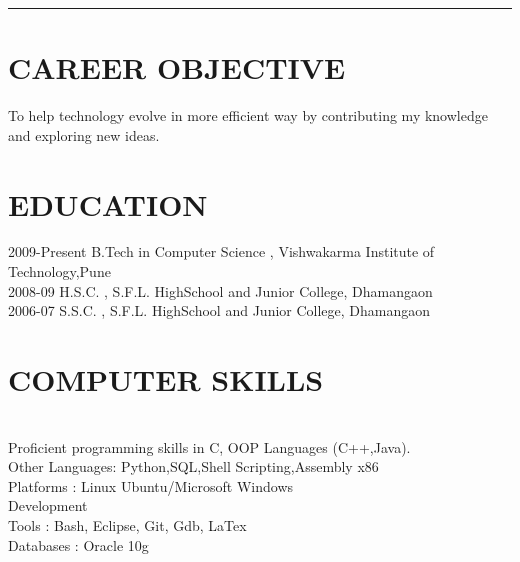 \documentclass{res}
\begin{document}
 


\address{\bf  CONTACT DETAILS\\ \\ Email : aakash.agrawal17@gmail.com\\Ph : +91-9503832567 }
\address{\bf POSTAL ADDRESS \\ Shivaji Nagar, \\ Dhamangaon(Rly) 444709 \\  (07222) 237209}

\begin{resume}
\rule{5.2in}{1pt}
\section{CAREER OBJECTIVE}          
    To help technology evolve in more efficient way by contributing my knowledge and exploring new ideas.           
 
\section{EDUCATION}          
    2009-Present \hspace{2mm} B.Tech in Computer Science , Vishwakarma Institute of Technology,Pune\hspace{2mm}{\bf CPI-9.35}\\        
    2008-09 \hspace{11mm}H.S.C. , S.F.L. HighSchool and Junior College, Dhamangaon\hspace{20mm}{\bf 94.00 \% }\\
    2006-07 \hspace{11mm}S.S.C. , S.F.L. HighSchool and Junior College, Dhamangaon\hspace{22mm}{\bf 87.23 \% }

\section{COMPUTER SKILLS}          
    \\         
    Proficient programming skills in C, OOP Languages (C++,Java).\\
	{Other Languages}\hspace{5mm}: Python,SQL,Shell Scripting,Assembly x86\\
 	Platforms \hspace{15mm}: Linux Ubuntu/Microsoft Windows\\
	{Development \\Tools} \hspace{22mm}: Bash, Eclipse, Git, Gdb, LaTex\\
	Databases \hspace{14.7mm}: Oracle 10g
 

\end{resume}
\end{document}

